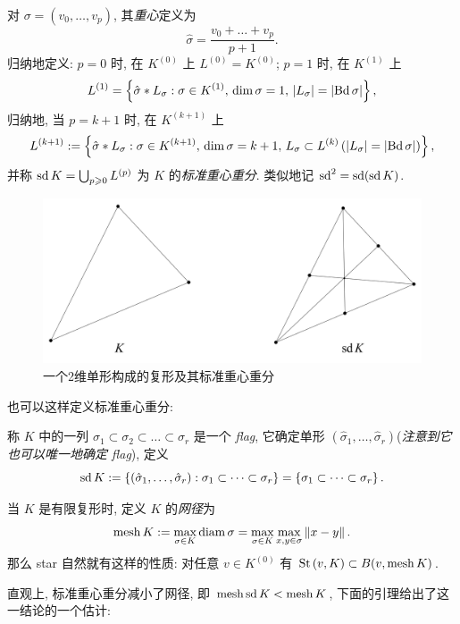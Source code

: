 \begin{Definition}[标准重心重分]
	对 $ \sigma=(v_0,\dots,v_p) $, 其\emph{重心}定义为
	\[
		\hat{\sigma}=\frac{v_0+\dots+v_p}{p+1}.
	\]
	归纳地定义: $ p=0 $ 时, 在 $ K^{(0)} $ 上 $ L^{(0)}=K^{(0)} $; $ p=1 $ 时, 在 $ K^{(1)} $ 上
	\[
		L^{(1)}=\left\{ \hat{\sigma}*L_\sigma : \sigma\in K^{(1)},\,\dim\sigma=1,\,\left| L_\sigma \right| =\left| \mathrm{Bd}\,\sigma \right|  \right\},
	\]
	归纳地, 当 $ p=k+1 $ 时, 在 $ K^{(k+1)} $ 上
	\[
		L^{(k+1)}:=\left\{ \hat{\sigma}*L_\sigma : \sigma\in K^{(k+1)},\,\dim\sigma=k+1,\,L_\sigma\subset L^{(k)}\,(\left| L_\sigma \right| =\left| \mathrm{Bd}\,\sigma \right| ) \right\},
	\]
	并称 $ \mathrm{sd}\,K=\bigcup_{p\geqslant 0}L^{(p)} $ 为 $ K $ 的\emph{标准重心重分}. 类似地记 $ \mathrm{sd}^2=\mathrm{sd}(\mathrm{sd}\,K) $.

	\begin{figure}[htbp]
		\centering
		\includegraphics[width=0.4\linewidth]{figures/Sec5-4.png}
		\caption{一个2维单形构成的复形及其标准重心重分}
	\end{figure}

	也可以这样定义标准重心重分:
	
	称 $ K $ 中的一列 $ \sigma_1\subset\sigma_2\subset\dots\subset\sigma_r $ 是一个 \emph{flag}, 它确定单形 $ (\hat{\sigma}_1,\dots,\hat{\sigma}_r) $(\textit{注意到它也可以唯一地确定 flag}), 定义
	\[
		\mathrm{sd}\,K:=\left\{ (\hat{\sigma}_1,\dots,\hat{\sigma}_r) : \sigma_1\subset\dots\subset\sigma_r \right\}=\left\{ \sigma_1\subset\dots\subset\sigma_r \right\}.
	\]
\end{Definition}

\begin{Definition}[网径]
	当 $ K $ 是有限复形时, 定义 $ K $ 的\emph{网径}为
	\[
		\mathrm{mesh}\, K:=\max_{\sigma\in K}\operatorname{diam}\sigma=\max_{\sigma\in K}\max_{x,y\in\sigma}\left\| x-y \right\|.
	\]
	那么 star 自然就有这样的性质: 对任意 $ v\in K^{(0)} $ 有 $ \mathrm{St}\,(v,K)\subset B(v,\mathrm{mesh}\, K) $.
\end{Definition}

直观上, 标准重心重分减小了网径, 即 $ \mathrm{mesh}\,\mathrm{sd}\,K<\mathrm{mesh}\, K $, 下面的引理给出了这一结论的一个估计:

